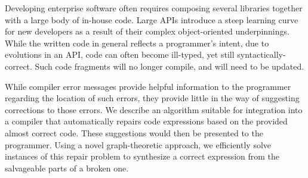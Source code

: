 Developing enterprise software often requires composing several
libraries together with a large body of in-house code. Large APIs
introduce a steep learning curve for new developers as a result of
their complex object-oriented underpinnings. While the written code in
general reflects a programmer's intent, due to evolutions in an API,
code can often become ill-typed, yet still syntactically-correct. Such
code fragments will no longer compile, and will need to be updated.


While compiler error messages provide helpful information to the
programmer regarding the location of such errors, they provide little
in the way of suggesting corrections to those errors. We describe an
algorithm suitable for integration into a compiler that automatically
repairs code expressions based on the provided almost correct
code. These suggestions would then be presented to the
programmer. Using a novel graph-theoretic approach, we efficiently
solve instances of this repair problem to synthesize a correct
expression from the salvageable parts of a broken one.
